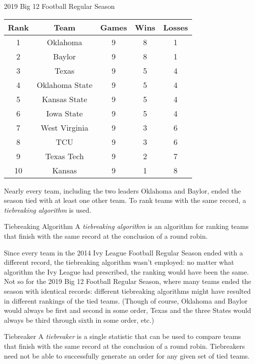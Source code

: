 {\begin{figg}{2019 Big 12 Football Regular Season}{}
    \centering
    \begin{tabular}{| c | c | c | c | c |}
        \hline
        Rank & Team & Games & Wins & Losses\\ \hline
        1 & Oklahoma & 9 & 8 & 1\\ \hline
        2 & Baylor & 9 & 8 & 1\\ \hline
        3 & Texas & 9 & 5 & 4\\ \hline
        4 & Oklahoma State & 9 & 5 & 4\\ \hline
        5 & Kansas State & 9 & 5 & 4\\ \hline
        6 & Iowa State & 9 & 5 & 4\\ \hline
        7 & West Virginia & 9 & 3 & 6\\ \hline
        8 & TCU & 9 & 3 & 6\\ \hline
        9 & Texas Tech & 9 & 2 & 7\\ \hline
        10 & Kansas & 9 & 1 & 8\\ \hline
    \end{tabular}
\end{figg}

Nearly every team, including the two leaders Oklahoma and Baylor, ended the season tied with at least one other team. To rank teams with the same record, a \textit{tiebreaking algorithm} is used.

\begin{definition}{Tiebreaking Algorithm}{}
    A \textit{tiebreaking algorithm} is an algorithm for ranking teams that finish with the same record at the conclusion of a round robin.
\end{definition}

Since every team in the 2014 Ivy League Football Regular Season ended with a different record, the tiebreaking algorithm wasn't employed: no matter what algorithm the Ivy League had prescribed, the ranking would have been the same. Not so for the 2019 Big 12 Football Regular Season, where many teams ended the season with identical records: different tiebreaking algorithms might have resulted in different rankings of the tied teams. (Though of course, Oklahoma and Baylor would always be first and second in some order, Texas and the three States would always be third through sixth in some order, etc.)

\begin{definition}{Tiebreaker}{}
    A \textit{tiebreaker} is a single statistic that can be used to compare teams that finish with the same record at the conclusion of a round robin. Tiebreakers need not be able to successfully generate an order for any given set of tied teams.
\end{definition}

}
